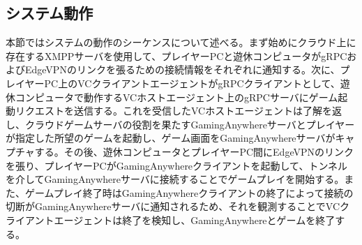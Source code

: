 \subsection{システム動作}
本節ではシステムの動作のシーケンスについて述べる。まず始めにクラウド上に存在するXMPPサーバを使用して、プレイヤーPCと遊休コンピュータがgRPCおよびEdgeVPNのリンクを張るための接続情報をそれぞれに通知する。次に、プレイヤーPC上のVCクライアントエージェントがgRPCクライアントとして、遊休コンピュータで動作するVCホストエージェント上のgRPCサーバにゲーム起動リクエストを送信する。これを受信したVCホストエージェントは了解を返し、クラウドゲームサーバの役割を果たすGamingAnywhereサーバとプレイヤーが指定した所望のゲームを起動し、ゲーム画面をGamingAnywhereサーバがキャプチャする。その後、遊休コンピュータとプレイヤーPC間にEdgeVPNのリンクを張り、プレイヤーPCがGamingAnywhereクライアントを起動して、トンネルを介してGamingAnywhereサーバに接続することでゲームプレイを開始する。また、ゲームプレイ終了時はGamingAnywhereクライアントの終了によって接続の切断がGamingAnywhereサーバに通知されるため、それを観測することでVCクライアントエージェントは終了を検知し、GamingAnywhereとゲームを終了する。
